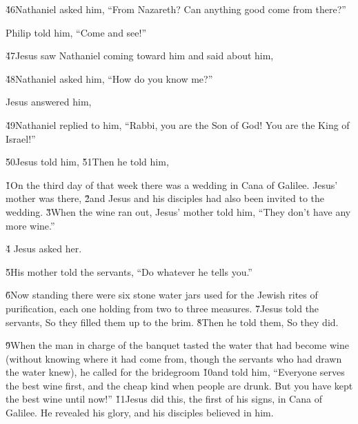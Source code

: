 \v{46}Nathaniel asked him, ``From Nazareth? Can anything good come from there?''

Philip told him, ``Come and see!''

\v{47}Jesus saw Nathaniel coming toward him and said about him, 

\v{48}Nathaniel asked him, ``How do you know me?''

Jesus answered him, 

\v{49}Nathaniel replied to him, ``Rabbi, you are the Son of God! You are the King of Israel!''

\v{50}Jesus told him,  \v{51}Then he told him,  

\v{1}On the third day of that week there was a wedding in Cana of Galilee. Jesus' mother was there, \v{2}and Jesus and his disciples had also been invited to the wedding. \v{3}When the wine ran out, Jesus' mother told him, ``They don't have any more wine.''

\v{4} Jesus asked her.

\v{5}His mother told the servants, ``Do whatever he tells you.''

\v{6}Now standing there were six stone water jars used for the Jewish rites of purification, each one holding from two to three measures. \v{7}Jesus told the servants,  So they filled them up to the brim. \v{8}Then he told them,  So they did.

\v{9}When the man in charge of the banquet tasted the water that had become wine (without knowing where it had come from, though the servants who had drawn the water knew), he called for the bridegroom \v{10}and told him, ``Everyone serves the best wine first, and the cheap kind when people are drunk. But you have kept the best wine until now!'' \v{11}Jesus did this, the first of his signs, in Cana of Galilee. He revealed his glory, and his disciples believed in him.

